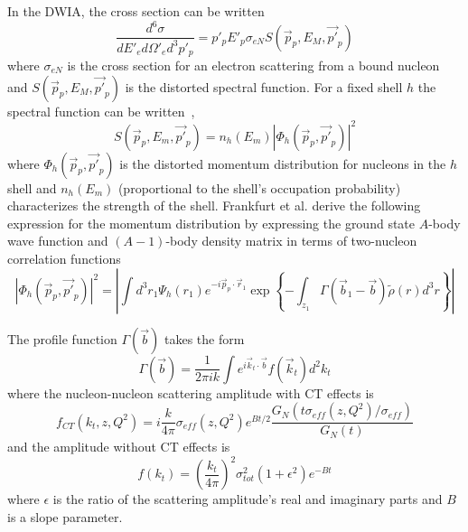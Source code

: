 
In the DWIA, the cross section can be written
\begin{equation}
    \frac{d^6\sigma}{dE'_{e} d\Omega'_{e} d^3p'_{p}} = p'_p E'_p \sigma_{eN} S(\vec{p}_p, E_M, \vec{p'}_p)
\end{equation}
where $\sigma_{eN}$ is the cross section for an electron scattering from a
bound nucleon and $S(\vec{p}_p, E_M, \vec{p'}_p)$ is the distorted
spectral function.
For a fixed shell $h$ the spectral function can be written~\cite{Frullani_1984},
\begin{equation}
    S(\vec{p}_p, E_m, \vec{p'}_p) = n_h(E_m) |\Phi_h(\vec{p}_p, \vec{p'}_p)|^2
\end{equation}
where $\Phi_h(\vec{p}_p, \vec{p'}_p)$ is the distorted momentum distribution for
nucleons in the $h$ shell
and
$n_h(E_m)$ (proportional to the shell's occupation probability) characterizes
the strength of the shell.
Frankfurt et al. derive the following expression for the momentum distribution
by expressing the ground state $A$-body wave function and $(A-1)$-body density
matrix in terms of two-nucleon correlation functions
\begin{equation}
    \left| \Phi_h(\vec{p}_p, \vec{p'}_p)\right|^2
        = \left|
            \int d^3 r_1 \Psi_h(r_1) e^{-i \vec{p}_p \cdot \vec{r}_1}
            \exp{\left\{- \int_{z_{1}} \Gamma\left(\vec{b}_1-\vec{b}\right) \tilde{\rho}(r) d^3 r\right\}}
          \right|
\end{equation}

The profile function $\Gamma(\vec{b})$ takes the form
\begin{equation}
    \Gamma(\vec{b}) = \frac{1}{2\pi i k}
                  \int e^{i\vec{k}_t \cdot \vec{b}} f(\vec{k}_t) d^2k_t
\end{equation}
where the nucleon-nucleon scattering amplitude with CT effects is
\begin{equation}
    f_{CT}(k_t, z, Q^2) = i\frac{k}{4\pi} \sigma_{eff}(z,Q^2) e^{Bt/2}
                          \frac{G_N\left( t \sigma_{eff}(z,Q^2)/\sigma_{eff} \right)}
                               {G_N\left( t \right)}
\end{equation}
and the amplitude without CT effects is
\begin{equation}
    f(k_t) = \left(\frac{k_t}{4\pi}\right)^2
             \sigma_{tot}^2
             (1+\epsilon^2) e^{-Bt}
\end{equation}
where
$\epsilon$ is the ratio of the scattering amplitude's real and imaginary parts
and
$B$ is a slope parameter.

